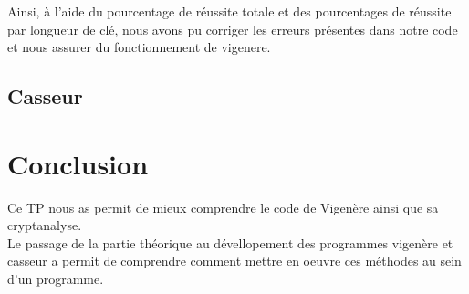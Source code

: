 \documentclass[a4paper, 11pt, oneside]{article}
\begin{document}
Ainsi, à l'aide du pourcentage de réussite totale et des pourcentages de réussite par longueur de clé, nous avons pu corriger les erreurs présentes dans notre code et nous assurer du fonctionnement de vigenere.

\subsection{Casseur}

\section*{Conclusion}

Ce TP nous as permit de mieux comprendre le code de Vigenère ainsi que sa cryptanalyse.\\
Le passage de la partie théorique au dévellopement des programmes vigenère et casseur a permit de comprendre comment mettre en oeuvre ces méthodes au sein d'un programme.
\end{document}
